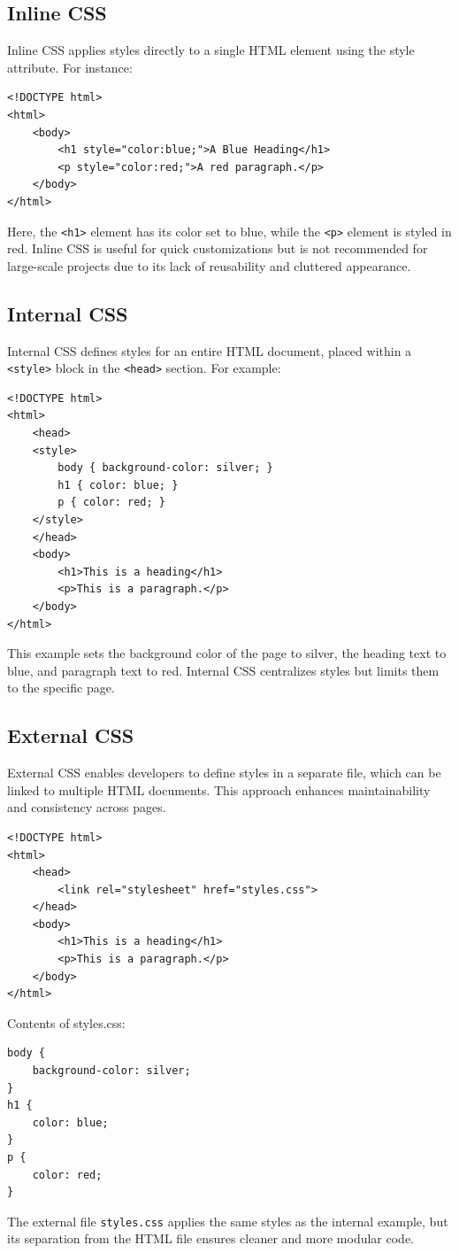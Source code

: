 \subsection*{Inline CSS}
Inline CSS applies styles directly to a single HTML element using the style attribute. For instance:
\begin{verbatim}
<!DOCTYPE html>
<html>
    <body>
        <h1 style="color:blue;">A Blue Heading</h1>
        <p style="color:red;">A red paragraph.</p>
    </body>
</html>
\end{verbatim}
Here, the \texttt{<h1>} element has its color set to blue, while the \texttt{<p>} element is styled in red. Inline CSS is useful for quick customizations but is not recommended for large-scale projects due to its lack of reusability and cluttered appearance.

\subsection*{Internal CSS}
Internal CSS defines styles for an entire HTML document, placed within a \texttt{<style>} block in the \texttt{<head>} section. For example:
\begin{verbatim}
<!DOCTYPE html>
<html>
    <head>
    <style>
        body { background-color: silver; }
        h1 { color: blue; }
        p { color: red; }
    </style>
    </head>
    <body>
        <h1>This is a heading</h1>
        <p>This is a paragraph.</p>
    </body>
</html>
\end{verbatim}
This example sets the background color of the page to silver, the heading text to blue, and paragraph text to red. Internal CSS centralizes styles but limits them to the specific page.

\subsection*{External CSS}
External CSS enables developers to define styles in a separate file, which can be linked to multiple HTML documents. This approach enhances maintainability and consistency across pages.
\begin{verbatim}
<!DOCTYPE html>
<html>
    <head>
        <link rel="stylesheet" href="styles.css">
    </head>
    <body>
        <h1>This is a heading</h1>
        <p>This is a paragraph.</p>
    </body>
</html>
\end{verbatim}
Contents of styles.css:
\begin{verbatim}
body {
    background-color: silver;
}
h1 {
    color: blue;
}
p {
    color: red;
}
\end{verbatim}
The external file \texttt{styles.css} applies the same styles as the internal example, but its separation from the HTML file ensures cleaner and more modular code.

